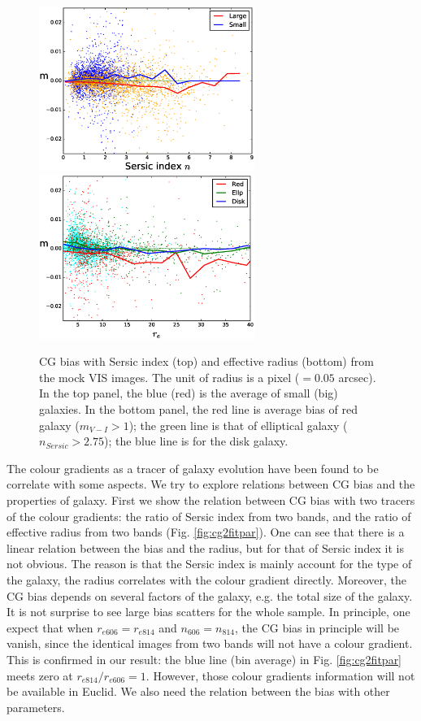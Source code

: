 \documentclass[useAMS,usenatbib]{mn2e}
\begin{document}
\begin{figure}
\includegraphics[width=7.0cm]{z2s-ne17.eps}
\includegraphics[width=7.0cm]{z2nscl-re17.eps}
\caption{CG bias with Sersic index (top) and effective radius (bottom)
  from the mock VIS images. The unit of radius is a pixel ($=0.05$
  arcsec). In the top panel, the blue (red) is the average of small
  (big) galaxies. In the bottom panel, the red line is average bias of
  red galaxy ($m_{V-I}>1$); the green line is that of elliptical
  galaxy ($n_{Sersic}>2.75$); the blue line is for the disk galaxy.}
\label{fig:cg2re}
\end{figure}
%
The colour gradients as a tracer of galaxy evolution have been found
to be correlate with some aspects. We try to explore relations between
CG bias and the properties of galaxy. First we show the relation
between CG bias with two tracers of the colour gradients: the ratio of
Sersic index from two bands, and the ratio of effective radius from
two bands (Fig. \ref{fig:cg2fitpar}). One can see that there is a
linear relation between the bias and the radius, but for that of
Sersic index it is not obvious. The reason is that the Sersic index is
mainly account for the type of the galaxy, the radius correlates with
the colour gradient directly. Moreover, the CG bias depends on several
factors of the galaxy, e.g. the total size of the galaxy. It is not
surprise to see large bias scatters for the whole sample. In
principle, one expect that when $r_{e606}=r_{e814}$ and
$n_{606}=n_{814}$, the CG bias in principle will be vanish, since the
identical images from two bands will not have a colour gradient. This
is confirmed in our result: the blue line (bin average) in
Fig. \ref{fig:cg2fitpar} meets zero at $r_{e814}/r_{e606}=1$. However,
those colour gradients information will not be available in Euclid. We
also need the relation between the bias with other parameters.
\end{document}
